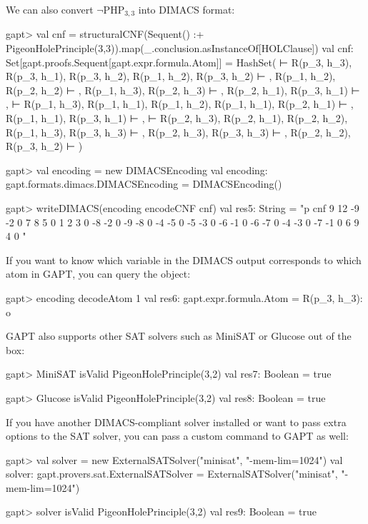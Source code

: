 \documentclass[a4paper,11pt]{book}
\newcommand{\cli}[1]{{\ttfamily {#1}}}
\begin{document}
We can also convert $\neg\mathrm{PHP}_{3,3}$ into DIMACS format:
\begin{clilisting}
  gapt> val cnf = structuralCNF(Sequent() :+ PigeonHolePrinciple(3,3)).map(_.conclusion.asInstanceOf[HOLClause])
  val cnf: Set[gapt.proofs.Sequent[gapt.expr.formula.Atom]] = HashSet( ⊢ R(p_3, h_3), R(p_3, h_1), R(p_3, h_2), R(p_1, h_2), R(p_3, h_2) ⊢ , R(p_1, h_2), R(p_2, h_2) ⊢ , R(p_1, h_3), R(p_2, h_3) ⊢ , R(p_2, h_1), R(p_3, h_1) ⊢ ,  ⊢ R(p_1, h_3), R(p_1, h_1), R(p_1, h_2), R(p_1, h_1), R(p_2, h_1) ⊢ , R(p_1, h_1), R(p_3, h_1) ⊢ ,  ⊢ R(p_2, h_3), R(p_2, h_1), R(p_2, h_2), R(p_1, h_3), R(p_3, h_3) ⊢ , R(p_2, h_3), R(p_3, h_3) ⊢ , R(p_2, h_2), R(p_3, h_2) ⊢ )

  gapt> val encoding = new DIMACSEncoding
  val encoding: gapt.formats.dimacs.DIMACSEncoding = DIMACSEncoding()

  gapt> writeDIMACS(encoding encodeCNF cnf)
  val res5: String = "p cnf 9 12
  -9 -2 0
  7 8 5 0
  1 2 3 0
  -8 -2 0
  -9 -8 0
  -4 -5 0
  -5 -3 0
  -6 -1 0
  -6 -7 0
  -4 -3 0
  -7 -1 0
  6 9 4 0
  "

\end{clilisting}

If you want to know which variable in the DIMACS output corresponds to which
atom in GAPT, you can query the \cli{DIMACSEncoding} object:
\begin{clilisting}
  gapt> encoding decodeAtom 1
  val res6: gapt.expr.formula.Atom = R(p_3, h_3): o

\end{clilisting}

GAPT also supports other SAT solvers such as MiniSAT or Glucose out of the box:
\begin{clilisting}
  gapt> MiniSAT isValid PigeonHolePrinciple(3,2)
  val res7: Boolean = true

\end{clilisting}
\begin{clilisting}
  gapt> Glucose isValid PigeonHolePrinciple(3,2)
  val res8: Boolean = true

\end{clilisting}

If you have another DIMACS-compliant solver installed or want to pass extra
options to the SAT solver, you can pass a custom command to GAPT as well:
\begin{clilisting}
  gapt> val solver = new ExternalSATSolver("minisat", "-mem-lim=1024")
  val solver: gapt.provers.sat.ExternalSATSolver = ExternalSATSolver("minisat", "-mem-lim=1024")

  gapt> solver isValid PigeonHolePrinciple(3,2)
  val res9: Boolean = true

\end{clilisting}
\end{document}
